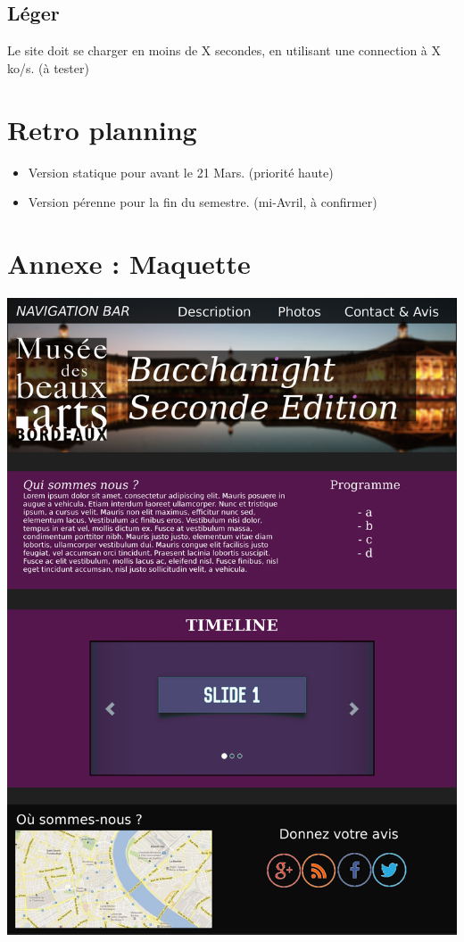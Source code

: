 \documentclass[11pt]{report}
\begin{document}
\subsection*{Léger}
Le site doit se charger en moins de X secondes, en utilisant une connection à
X ko/s. (à tester)


\section{Retro planning}

\begin{itemize}
	\item Version statique pour avant le 21 Mars. (priorité haute)
	\item Version pérenne pour la fin du semestre. (mi-Avril, à confirmer)
\end{itemize}


\newpage

\section{Annexe : Maquette}

\vspace{0.4cm}
\includegraphics[scale=0.75]{maquette.jpg}
\end{document}
